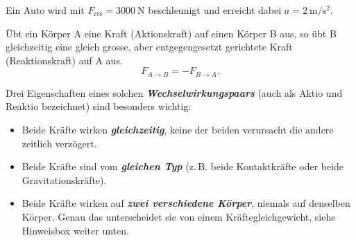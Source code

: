 \documentclass[addpoints,11pt,a4paper]{exam}
\newlength{\antwortraumlen}
\newcommand{\Antwortraum}[1]{%
  \pgfmathsetlength{\antwortraumlen}{#1*2.5cm}%
  \begin{answerbox}
    \rule{0pt}{\antwortraumlen}%
  \end{answerbox}%
}
\begin{document}
\begin{questions}
\begin{taskbox}
\question[5] Ein Auto wird mit $F_{\text{res}}=\SI{3000}{\newton}$
beschleunigt und erreicht dabei $a=\SI{2}{\meter\per\second\squared}$.

\end{taskbox}
\end{questions}

\begin{theoriebox}
\begin{merksatzbox}
Übt ein Körper A eine Kraft (Aktionskraft) auf einen Körper B aus, so
übt B gleichzeitig eine gleich grosse, aber entgegengesetzt gerichtete
Kraft (Reaktionskraft) auf A aus.
\[
  F_{A\to B} = -F_{B\to A}.
\]
\end{merksatzbox}

Drei Eigenschaften eines solchen \textbf{\emph{Wechselwirkungspaars}}
(auch als Aktio und Reaktio bezeichnet) sind besonders wichtig:
\begin{itemize}[leftmargin=1.2cm,itemsep=0.2em]
  \item Beide Kräfte wirken \textbf{\emph{gleichzeitig}}, keine der
  beiden \glqq verursacht\grqq{} die andere zeitlich verzögert.
  \item Beide Kräfte sind vom \textbf{\emph{gleichen Typ}} (z.\,B. beide
  Kontaktkräfte oder beide Gravitationskräfte).
  \item Beide Kräfte wirken auf \textbf{\emph{zwei verschiedene
  Körper}}, niemals auf denselben Körper. Genau das unterscheidet sie
  von einem Kräftegleichgewicht, siehe Hinweisbox weiter unten.
\end{itemize}
\end{theoriebox}
\end{document}
